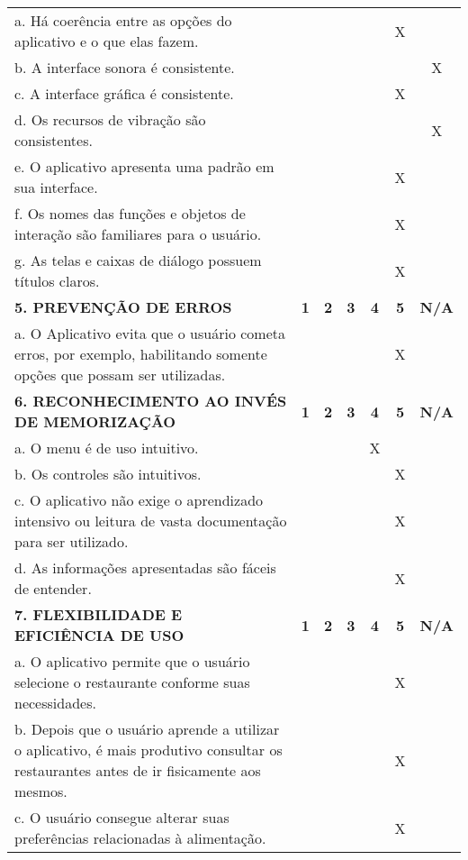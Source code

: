 \documentclass[portuguese,oneside]{tcc}
\begin{document}
\begin{center}
\begin{longtabu}{|L{25em}|c|c|c|c|c|c|}
			a. Há coerência entre as opções do aplicativo e o que elas fazem. & & & & & X & \\ 
			b. A interface sonora é consistente. & & & & & & X \\ 
			c. A interface gráfica é consistente. & & & & & X & \\ 
			d. Os recursos de vibração são consistentes. & & & & & & X \\ 
			e. O aplicativo apresenta uma padrão em sua interface. & & & & & X & \\ 
			f. Os nomes das funções e objetos de interação são familiares para o usuário. & & & & & X & \\ 
			g. As telas e caixas de diálogo possuem títulos claros. & & & & & X & \\ 
			\textbf{5. PREVENÇÃO DE ERROS} & \textbf{1} & \textbf{2} & \textbf{3} & \textbf{4} & \textbf{5} & \textbf{N/A} \\ 
			a. O Aplicativo evita que o usuário cometa erros, por exemplo, habilitando somente opções que possam ser utilizadas. & & & & & X & \\ 
			\textbf{6. RECONHECIMENTO AO INVÉS DE MEMORIZAÇÃO} & \textbf{1} & \textbf{2} & \textbf{3} & \textbf{4} & \textbf{5} & \textbf{N/A} \\ 
			a. O  menu é de uso intuitivo. & & & & X & & \\ 
			b. Os controles são intuitivos. & & & & & X & \\ 
			c. O aplicativo não exige o aprendizado intensivo ou leitura de vasta documentação para ser utilizado. & & & & & X & \\ 
			d. As informações apresentadas são fáceis de entender. & & & & & X & \\ 
			\textbf{7. FLEXIBILIDADE E EFICIÊNCIA DE USO} & \textbf{1} & \textbf{2} & \textbf{3} & \textbf{4} & \textbf{5} & \textbf{N/A} \\ 
			a. O aplicativo permite que o usuário selecione o restaurante conforme suas necessidades. & & & & & X & \\ 
			b. Depois que o usuário aprende a utilizar o aplicativo, é mais produtivo consultar os restaurantes antes de ir fisicamente aos mesmos. & & & & & X & \\ 
			c. O usuário consegue alterar suas preferências relacionadas à alimentação. & & & & & X & \\ 

\end{longtabu}
\end{center}
\end{document}
